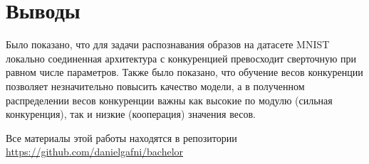 \documentclass[a4paper]{article}
\begin{document}
\clearpage
{}
\section*{Выводы}
Было показано, что для задачи распознавания образов на датасете MNIST локально соединенная архитектура с конкуренцией превосходит сверточную при равном числе параметров.
Также было показано, что обучение весов конкуренции позволяет незначительно повысить качество модели, а в полученном распределении весов конкуренции важны как высокие по модулю (сильная конкуренция), так и низкие (кооперация) значения весов.


\printbibliography[sorting=none,heading=bibintoc,type=article,title={Литература}]
 
\begin{center}
Все материалы этой работы находятся в репозитории\\
\href{https://github.com/danielgafni/bachelor}{https://github.com/danielgafni/bachelor} 
\end{center}
\end{document}
